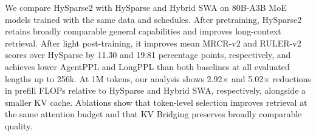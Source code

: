 We compare HySparse2 with HySparse and Hybrid SWA on 80B-A3B MoE models trained with the same data and schedules. After pretraining, HySparse2 retains broadly comparable general capabilities and improves long-context retrieval. After light post-training, it improves mean MRCR-v2 and RULER-v2 scores over HySparse by 11.30 and 19.81 percentage points, respectively, and achieves lower AgentPPL and LongPPL than both baselines at all evaluated lengths up to 256k. At 1M tokens, our analysis shows 2.92× and 5.02× reductions in prefill FLOPs relative to HySparse and Hybrid SWA, respectively, alongside a smaller KV cache. Ablations show that token-level selection improves retrieval at the same attention budget and that KV Bridging preserves broadly comparable quality.

